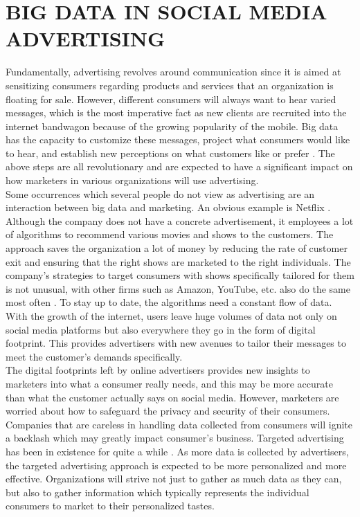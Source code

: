 \documentclass[sigconf]{acmart}
\begin{document}
\section{BIG DATA IN SOCIAL MEDIA ADVERTISING}

Fundamentally, advertising revolves around communication since it is aimed at sensitizing consumers regarding products and services that an organization is floating for sale. However, different consumers will always want to hear varied messages, which is the most imperative fact as new clients are recruited into the internet bandwagon because of the growing popularity of the mobile. Big data has the capacity to customize these messages, project what consumers would like to hear, and establish new perceptions on what customers like or prefer \cite{Hensel&Deis2010}. The above steps are all revolutionary and are expected to have a significant impact on how marketers in various organizations will use advertising.  \\
Some occurrences which several people do not view as advertising are an interaction between big data and marketing. An obvious example is Netflix \cite{Eastwood2017}. Although the company does not have a concrete advertisement, it employees a lot of algorithms to recommend various movies and shows to the customers. The approach saves the organization a lot of money by reducing the rate of customer exit and ensuring that the right shows are marketed to the right individuals. The company’s strategies to target consumers with shows specifically tailored for them is not unusual, with other firms such as Amazon, YouTube, etc. also do the same most often \cite{Eastwood2017}. To stay up to date, the algorithms need a constant flow of data. With the growth of the internet, users leave huge volumes of data not only on social media platforms but also everywhere they go in the form of digital footprint.  This provides advertisers with new avenues to tailor their messages to meet the customer's demands specifically. \\
The digital footprints left by online advertisers provides new insights to marketers into what a consumer really needs, and this may be more accurate than what the customer actually says on social media. However, marketers are worried about how to safeguard the privacy and security of their consumers. Companies that are careless in handling data collected from consumers will ignite a backlash which may greatly impact consumer’s business. Targeted advertising has been in existence for quite a while \cite{Eastwood2017}. As more data is collected by advertisers, the targeted advertising approach is expected to be more personalized and more effective. Organizations will strive not just to gather as much data as they can, but also to gather information which typically represents the individual consumers to market to their personalized tastes. 
\end{document}
